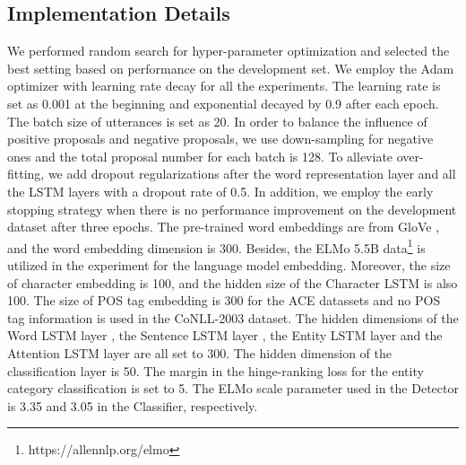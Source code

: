 \documentclass[11pt,a4paper]{article}
\begin{document}
\subsection{Implementation Details}
We performed random search \cite{bergstra2012random} for hyper-parameter optimization and selected the best setting based on performance on the development set.
We employ the Adam optimizer \cite{kingma2014adam} with learning rate decay for all the experiments. The learning rate is set as 0.001 at the beginning and exponential decayed by 0.9 after each epoch.
The batch size of utterances is set as 20. In order to balance the influence of positive proposals and negative proposals, we use down-sampling for negative ones and the total proposal number  for each batch is 128.
To alleviate over-fitting, we add dropout regularizations after the word representation layer and all the LSTM layers with a dropout rate of 0.5.
In addition, we employ the early stopping strategy when there is no performance improvement on the development dataset after three epochs.
The pre-trained word embeddings are from GloVe \cite{pennington2014glove}, and the word embedding dimension  is 300. Besides, the ELMo 5.5B data\footnote{https://allennlp.org/elmo} is utilized in the experiment for the language model embedding. 
Moreover, the size of character embedding   is 100, and the hidden size of the Character LSTM  is also 100.
The size of POS tag embedding  is 300 for the ACE datassets and no POS tag information is used in the CoNLL-2003 dataset. 
The hidden dimensions of the Word LSTM layer , the Sentence LSTM layer , the Entity LSTM layer  and the Attention LSTM layer  are all set to 300. 
The hidden dimension of the classification layer  is 50. The margin  in the hinge-ranking loss for the entity category classification is set to 5.
The ELMo scale parameter  used in the Detector is 3.35 and 3.05 in the Classifier, respectively.
\end{document}
